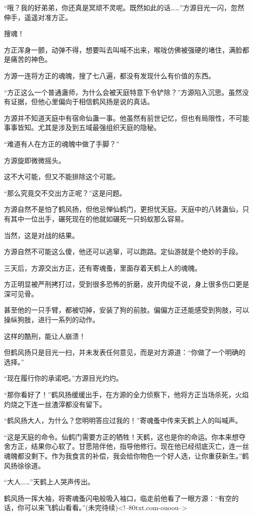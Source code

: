\begin{this_body}
“哦？我的好弟弟，你还真是冥顽不灵呢。既然如此的话……”方源目光一闪，忽然伸手，遥遥对准方正。

搜魂！

方正浑身一颤，动弹不得，想要叫去叫喊不出来，喉咙仿佛被强硬的堵住，满脸都是痛苦的神色。

方源一连将方正的魂魄，搜了七八遍，都没有发现什么有价值的东西。

“方正这么一个普通蛊师，为什么会被天庭特意下令铲除？”方源陷入沉思。虽然没有证据，但他心里偏向于相信鹤风扬是说的真话。

方源并不知道天庭中有宿命仙蛊一事。他虽然有前世记忆，但也有局限性，不可能事事皆知。尤其是涉及到五域最强组织天庭的隐秘。

“难道有人在方正的魂魄中做了手脚？”

方源旋即微微摇头。

这不大可能，但又不能排除这个可能。

“那么究竟交不交出方正呢？”这是问题。

方源自然不是怕了鹤风扬，但他忌惮仙鹤门，更担忧天庭。天庭中的八转蛊仙，只有其中一位出手，碾死现在的他就如碾死一只蚂蚁那么容易。

当然，这是对战的结果。

方源自然不可能这么傻，他还可以逃窜，可以跑路。定仙游就是个绝妙的手段。

三天后，方源交出方正，还有寄魂蚤，里面存着天鹤上人的魂魄。

方正明显被严刑拷打过，受到很多恐怖的折磨，皮开肉绽不说，身上很多伤口更是深可见骨。

甚至他的一只手臂，都被切掉，安装了狗的前肢。偏偏方正还能感受到狗肢，可以操纵狗肢，进行一系列的动作。

这样的酷刑，能让人崩溃！

但鹤风扬只是目光一扫，并未发表任何意见，而是对方源道：“你做了一个明确的选择。”

“现在履行你的承诺吧。”方源目光灼灼。

“那你看好了！”鹤风扬缓缓出手，在方源的全力侦察下，他将方正当场杀死，火焰灼烧之下连一丝渣滓都没有留下。

“鹤风扬大人，为什么？您明明答应过我的！”寄魂蚤中传来天鹤上人的叫喊声。

“这是天庭的命令。仙鹤门需要方正的牺牲！天鹤，这也是你的命运。你本来想夺舍方正，结果你心软了。甘愿陪伴他，指导他修行。现在他已经彻底灭亡，连一丝魂魄都没剩下。作为我食言的补偿，我会给你物色一个好人选，让你重获新生。”鹤风扬徐徐道。

“大人……”天鹤上人哭声传出。

鹤风扬一挥大袖，将寄魂蚤闪电般吸入袖口，临走前他看了一眼方源：“有空的话，你可以来飞鹤山看看。”(未完待续)<!--80txt.com-ouoou-->

\end{this_body}

